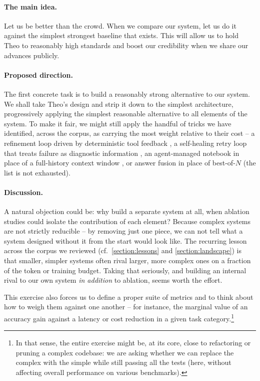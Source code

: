\paragraph{The main idea.}
Let us be better than the crowd. When we compare our system, let us do it against the simplest strongest baseline that exists.
This will allow us to hold Theo to reasonably high standards and boost our credibility when we share our advances publicly.

\paragraph{Proposed direction.}
The first concrete task is to build a reasonably strong alternative to our system. We shall take Theo's design and strip it down to the simplest architecture, progressively applying the simplest reasonable alternative to all elements of the system. 
To make it fair, we might still apply the handful of tricks we have identified, across the corpus, as carrying the most weight relative to their cost -- a refinement loop driven by deterministic tool feedback \cite{2602.24273}, a self-healing retry loop that treats failure as diagnostic information \cite{2605.20025, 2605.28655}, an agent-managed notebook in place of a full-history context window \cite{2602.24273}, or answer fusion in place of best-of-$N$ \cite{2510.00931} (the list is not exhausted).

\paragraph{Discussion.}
A natural objection could be: why build a separate system at all, when ablation studies could isolate the contribution of each element? Because complex systems are not strictly reducible -- by removing just one piece, we can not tell what a system designed without it from the start would look like. The recurring lesson across the corpus we reviewed (cf.\ \ref{section:lessons} and \ref{section:landscape}) is that smaller, simpler systems often rival larger, more complex ones on a fraction of the token or training budget. Taking that seriously, and building an internal rival to our own system \emph{in addition} to ablation, seems worth the effort.

This exercise also forces us to define a proper suite of metrics and to think about how to weigh them against one another -- for instance, the marginal value of an accuracy gain against a latency or cost reduction in a given task category.\footnote{
    In that sense, the entire exercise might be, at its core, close to refactoring or pruning a complex codebase: we are asking whether we can replace the complex with the simple while still passing all the tests (here, without affecting overall performance on various benchmarks).
}

